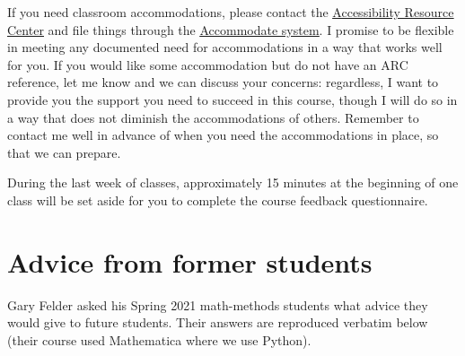 \documentclass{tufte-handout}
\let\syllabushref\href
\renewcommand{\href}[2]{\syllabushref{#1}{\uline{#2}}}%
\begin{document}
 If you need classroom accommodations,
please contact the \href{mailto:ARC@smith.edu}{Accessibility Resource Center}
and file things through the
\href{https://smith-accommodate.symplicity.com/}{Accommodate system}. I promise
to be flexible in meeting any documented need for accommodations in a way that
works well for you. If you would like some accommodation but do not have an ARC
reference, let me know and we can discuss your concerns: regardless, I want to
provide you the support you need to succeed in this course, though I will do so
in a way that does not diminish the accommodations of others. Remember to
contact me well in advance of when you need the accommodations in place, so that
we can prepare.


 During the last week of classes,
approximately 15 minutes at the beginning of one class will be set
aside for you to complete the course feedback questionnaire.


\section{Advice from former students}\label{sec:advice}

Gary Felder asked his Spring 2021 math-methods students
what advice they would give to future students. Their answers are
reproduced verbatim below (their course used Mathematica where we use
Python).
\end{document}
